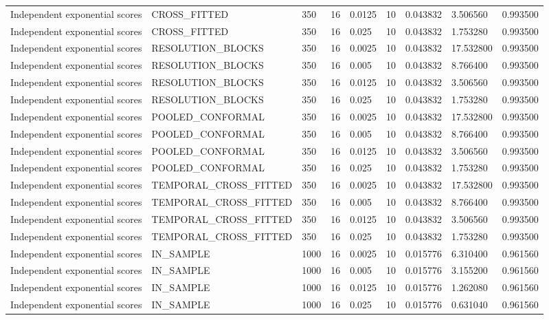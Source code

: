\begin{tabular}{lllllllll}
Independent exponential scores & CROSS\_FITTED & 350 & 16 & 0.0125 & 10 & 0.043832 & 3.506560 & 0.993500 \\
Independent exponential scores & CROSS\_FITTED & 350 & 16 & 0.025 & 10 & 0.043832 & 1.753280 & 0.993500 \\
Independent exponential scores & RESOLUTION\_BLOCKS & 350 & 16 & 0.0025 & 10 & 0.043832 & 17.532800 & 0.993500 \\
Independent exponential scores & RESOLUTION\_BLOCKS & 350 & 16 & 0.005 & 10 & 0.043832 & 8.766400 & 0.993500 \\
Independent exponential scores & RESOLUTION\_BLOCKS & 350 & 16 & 0.0125 & 10 & 0.043832 & 3.506560 & 0.993500 \\
Independent exponential scores & RESOLUTION\_BLOCKS & 350 & 16 & 0.025 & 10 & 0.043832 & 1.753280 & 0.993500 \\
Independent exponential scores & POOLED\_CONFORMAL & 350 & 16 & 0.0025 & 10 & 0.043832 & 17.532800 & 0.993500 \\
Independent exponential scores & POOLED\_CONFORMAL & 350 & 16 & 0.005 & 10 & 0.043832 & 8.766400 & 0.993500 \\
Independent exponential scores & POOLED\_CONFORMAL & 350 & 16 & 0.0125 & 10 & 0.043832 & 3.506560 & 0.993500 \\
Independent exponential scores & POOLED\_CONFORMAL & 350 & 16 & 0.025 & 10 & 0.043832 & 1.753280 & 0.993500 \\
Independent exponential scores & TEMPORAL\_CROSS\_FITTED & 350 & 16 & 0.0025 & 10 & 0.043832 & 17.532800 & 0.993500 \\
Independent exponential scores & TEMPORAL\_CROSS\_FITTED & 350 & 16 & 0.005 & 10 & 0.043832 & 8.766400 & 0.993500 \\
Independent exponential scores & TEMPORAL\_CROSS\_FITTED & 350 & 16 & 0.0125 & 10 & 0.043832 & 3.506560 & 0.993500 \\
Independent exponential scores & TEMPORAL\_CROSS\_FITTED & 350 & 16 & 0.025 & 10 & 0.043832 & 1.753280 & 0.993500 \\
Independent exponential scores & IN\_SAMPLE & 1000 & 16 & 0.0025 & 10 & 0.015776 & 6.310400 & 0.961560 \\
Independent exponential scores & IN\_SAMPLE & 1000 & 16 & 0.005 & 10 & 0.015776 & 3.155200 & 0.961560 \\
Independent exponential scores & IN\_SAMPLE & 1000 & 16 & 0.0125 & 10 & 0.015776 & 1.262080 & 0.961560 \\
Independent exponential scores & IN\_SAMPLE & 1000 & 16 & 0.025 & 10 & 0.015776 & 0.631040 & 0.961560 \\

\end{tabular}
